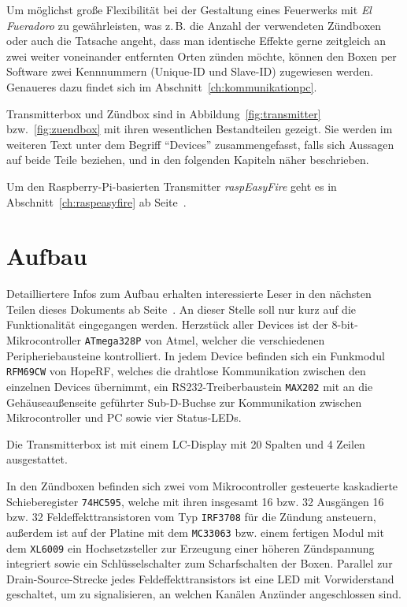 \documentclass[paper=a4, parskip, numbers=noenddot, toc=listof, headsepline]{scrbook}
\newcommand{\anlage}{\emph{El Fueradoro}}
\begin{document}
		Um möglichst große Flexibilität bei der Gestaltung eines Feuerwerks mit {\anlage} zu gewährleisten, was z.\,B. die Anzahl der verwendeten Zündboxen oder auch die Tatsache angeht, dass man identische Effekte gerne zeitgleich an zwei weiter voneinander entfernten Orten zünden möchte, können den Boxen per Software zwei Kennnummern (Unique-ID und Slave-ID) zugewiesen werden. Genaueres dazu findet sich im Abschnitt~\ref{ch:kommunikationpc}.

		Transmitterbox und Zündbox sind in Abbildung~\ref{fig:transmitter} bzw.~\ref{fig:zuendbox} mit ihren wesentlichen Bestandteilen gezeigt. Sie werden im weiteren Text unter dem Begriff \enquote{Devices} zusammengefasst, falls sich Aussagen auf beide Teile beziehen, und in den folgenden Kapiteln näher beschrieben.
		
		Um den Raspberry-Pi-basierten Transmitter \emph{raspEasyFire} geht es in Abschnitt~\ref{ch:raspeasyfire} ab Seite~\pageref{ch:raspeasyfire}.

		\section{Aufbau}

			Detailliertere Infos zum Aufbau erhalten interessierte Leser in den nächsten Teilen dieses Dokuments ab Seite~\pageref{part:dokumentation}. An dieser Stelle soll nur kurz auf die Funktionalität eingegangen werden. Herzstück aller Devices ist der 8-bit-Mikrocontroller \texttt{ATmega328P} von Atmel, welcher die verschiedenen Peripheriebausteine kontrolliert. In jedem Device befinden sich ein Funkmodul \texttt{RFM69CW} von HopeRF, welches die drahtlose Kommunikation zwischen den einzelnen Devices übernimmt, ein RS232-Treiberbaustein \texttt{MAX202} mit an die Gehäuseaußenseite geführter Sub-D-Buchse zur Kommunikation zwischen Mikrocontroller und PC sowie vier Status-LEDs.

			Die Transmitterbox ist mit einem LC-Display mit 20 Spalten und 4 Zeilen ausgestattet.

			In den Zündboxen befinden sich zwei vom Mikrocontroller gesteuerte kaskadierte Schieberegister \texttt{74HC595}, welche mit ihren insgesamt 16 bzw. 32 Ausgängen 16 bzw. 32 Feldeffekttransistoren vom Typ \texttt{IRF3708} für die Zündung ansteuern, außerdem ist auf der Platine mit dem \texttt{MC33063} bzw. einem fertigen Modul mit dem \texttt{XL6009} ein Hochsetzsteller zur Erzeugung einer höheren Zündspannung integriert sowie ein Schlüsselschalter zum Scharfschalten der Boxen. Parallel zur Drain-Source-Strecke jedes Feldeffekttransistors ist eine LED mit Vorwiderstand geschaltet, um zu signalisieren, an welchen Kanälen Anzünder angeschlossen sind.
\end{document}
